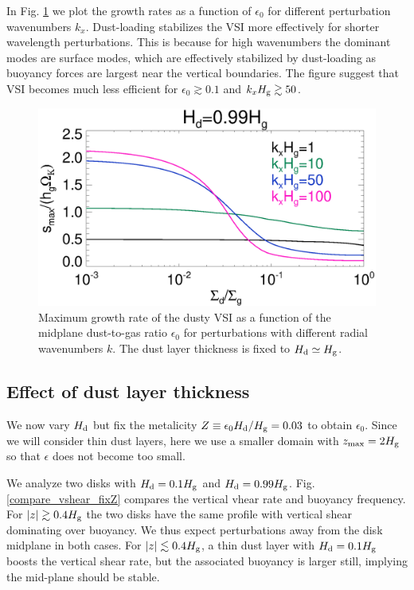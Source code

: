 In Fig. \ref{vsi_dust_loading_vareps} we plot the growth rates as a
function of $\epsilon_0$ for different perturbation wavenumbers
$k_x$. Dust-loading stabilizes the VSI more effectively for shorter
wavelength perturbations. This is because for high wavenumbers the
dominant modes are surface modes, which are effectively stabilized by
dust-loading as buoyancy forces are largest near the vertical 
boundaries. The figure suggest that VSI becomes much less efficient
for $\epsilon_0\gtrsim 0.1$ and $k_xH_\mathrm{g}\gtrsim 50$. 

\begin{figure}
  \includegraphics[width=\linewidth]{figures/compare_eigenvals_vareps2} 
  \caption{Maximum growth rate of the dusty VSI as a function of the
    midplane dust-to-gas ratio $\epsilon_0$ for perturbations with
    different radial wavenumbers $k$. The dust layer thickness is
    fixed to $H_\mathrm{d}\simeq H_\mathrm{g}$. 
    \label{vsi_dust_loading_vareps}
    }
\end{figure}




\subsection{Effect of dust layer thickness} 
We now vary $H_\mathrm{d}$ but fix the metalicity 
$Z \equiv \epsilon_0 H_\mathrm{d}/H_\mathrm{g} = 0.03$ to obtain $\epsilon_0$. Since we
will consider thin dust layers, here we use a smaller   
domain with $z_\mathrm{max}=2H_\mathrm{g}$ so that $\epsilon$ does not become
too small. 

We analyze two disks with $H_\mathrm{d}=0.1H_\mathrm{g}$ and 
$H_\mathrm{d}=0.99H_\mathrm{g}$. Fig. \ref{compare_vshear_fixZ} compares the vertical
vhear rate and buoyancy frequency. For $|z|\gtrsim 0.4H_\mathrm{g}$ the two
disks have the same profile with vertical shear dominating over
buoyancy. We thus expect perturbations away from the disk midplane in 
both cases. For $|z|\lesssim 0.4H_\mathrm{g}$, a thin dust 
layer with $H_\mathrm{d}=0.1H_\mathrm{g}$ boosts the vertical shear rate, but the
associated buoyancy is larger still, implying the mid-plane should be
stable. 

